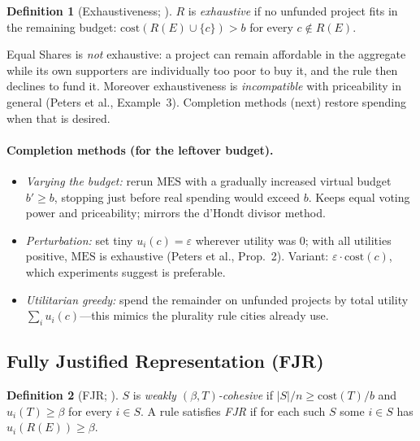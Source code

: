 \documentclass[11pt,letterpaper]{article}
\theoremstyle{definition}
\newtheorem{definition}{Definition}[section]
\theoremstyle{plain}
\theoremstyle{remark}
\newcommand{\budget}{b}            %
\newcommand{\cost}{\mathrm{cost}}  %
\newcommand{\MES}{\mathrm{MES}}
\begin{document}
\begin{definition}[Exhaustiveness; \citealp{aziztalmon2018}]
$R$ is \emph{exhaustive} if no unfunded project fits in the remaining budget:
$\cost(R(E)\cup\{c\})>\budget$ for every $c\notin R(E)$.
\end{definition}

\begin{watchout}
Equal Shares is \emph{not} exhaustive: a project can remain affordable in the aggregate while its
own supporters are individually too poor to buy it, and the rule then declines to fund it.
Moreover exhaustiveness is \emph{incompatible} with priceability in general (Peters et al.,
Example~3). Completion methods (next) restore spending when that is desired.
\end{watchout}

\paragraph{Completion methods (for the leftover budget).}
\begin{itemize}[leftmargin=1.4em,itemsep=2pt,topsep=2pt]
  \item \emph{Varying the budget:} rerun $\MES$ with a gradually increased virtual budget $b'\ge
  \budget$, stopping just before real spending would exceed $\budget$. Keeps equal voting power and
  priceability; mirrors the d'Hondt divisor method.
  \item \emph{Perturbation:} set tiny $u_i(c)=\varepsilon$ wherever utility was $0$; with all
  utilities positive, $\MES$ is exhaustive (Peters et al., Prop.~2). Variant: $\varepsilon\cdot
  \cost(c)$, which experiments suggest is preferable.
  \item \emph{Utilitarian greedy:} spend the remainder on unfunded projects by total utility
  $\sum_i u_i(c)$---this mimics the plurality rule cities already use.
\end{itemize}

\subsection{Fully Justified Representation (FJR)}

\begin{definition}[FJR; \citealp{peters2021}]
$S$ is \emph{weakly $(\beta,T)$-cohesive} if $|S|/n\ge\cost(T)/\budget$ and $u_i(T)\ge\beta$ for
every $i\in S$. A rule satisfies \emph{FJR} if for each such $S$ some $i\in S$ has
$u_i(R(E))\ge\beta$.
\end{definition}
\end{document}

